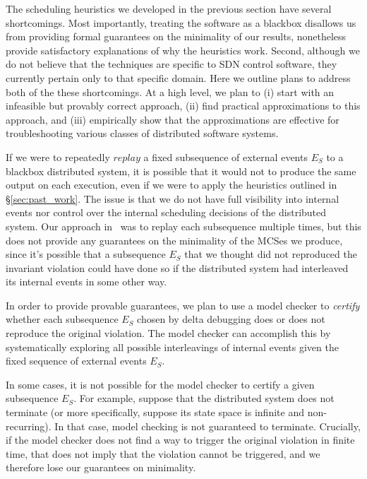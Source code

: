 The scheduling heuristics we developed in the previous section have several
shortcomings. Most importantly, treating the software as a blackbox disallows us
from providing formal guarantees on the minimality of our results, nonetheless
provide satisfactory explanations of why the heuristics work. Second,
although we do not believe that the techniques are
specific to SDN control software, they currently pertain only to that specific
domain. Here we outline plans to address both of the these shortcomings.
At a high level, we plan to (i) start with an infeasible but provably correct approach,
(ii) find practical approximations to this approach, and (iii) empirically show that
the approximations are effective for
troubleshooting various classes of distributed software systems.

 If we were to repeatedly
$replay$ a
fixed subsequence of external events $E_S$ to a blackbox distributed system,
it is possible that it would not to produce the same output on each
execution, even if we were to apply the heuristics outlined in
\S\ref{sec:past_work}. The issue is that we do not have full visibility into internal
events nor control over the internal scheduling decisions of the distributed
system. Our approach in~\cite{sts2014} was to
replay each subsequence multiple times, but this does not provide any
guarantees on the minimality of the MCSes we produce, since it's possible that
a subsequence $E_S$ that we thought did not reproduced the invariant violation
 could have done so if the
distributed system had interleaved its internal events in some other way.

In order to provide provable guarantees, we plan to use a model checker to
{\em certify} whether each subsequence $E_S$ chosen by delta debugging does or
does not reproduce the original violation. The model checker can accomplish this
by systematically exploring all possible interleavings of internal events
given the fixed sequence of external events $E_S$.

 In some cases, it is not possible for the model checker to certify a
given subsequence $E_S$. For example, suppose that the distributed system does
not terminate (or more specifically, suppose its state space is infinite
and non-recurring). In that case, model checking is not guaranteed to terminate.
Crucially, if the
model checker does not find a way to trigger the original violation in finite time,
that does not imply that the violation cannot be triggered, and we therefore lose our guarantees on minimality.


